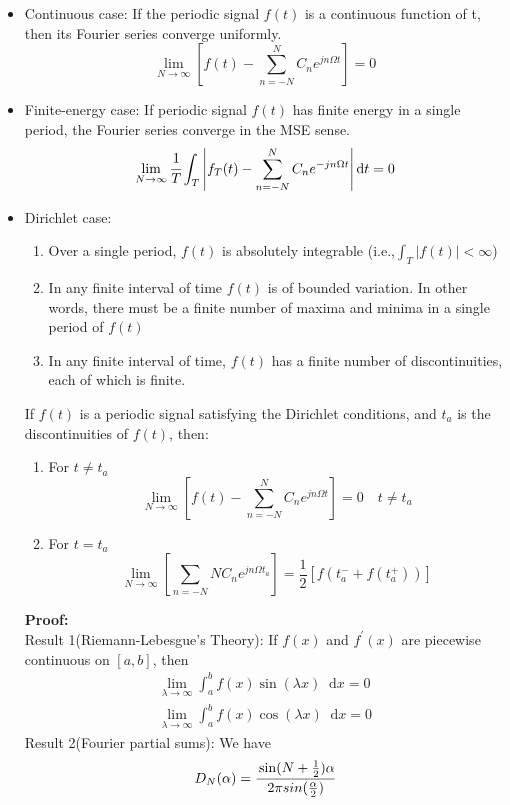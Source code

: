 \documentclass[margin,line]{res}
\newcommand*{\dif}{\mathop{}\!\mathrm{d}}
\begin{document}
\begin{resume}
\begin{itemize}
\item Continuous case: If the periodic signal $f(t)$ is a continuous function of t, then its Fourier series converge uniformly.
$$
\lim_{N \rightarrow \infty} \left[ f(t) - \sum\limits_{n=-N}^{N}{C_n e^{jn\Omega t}} \right] = 0
$$
\item Finite-energy case: If periodic signal $f(t)$ has finite energy in a single period, the Fourier series converge in the MSE sense.
$$
\lim_{N \rightarrow \infty} \cfrac{1}{T} \int_{T}\left| f_T(t) - \sum\limits_{n=-N}^{N}C_n e^{-jn\Omega t} \right| \dif t  = 0\nonumber
$$
\item Dirichlet case:
\begin{enumerate}
	\item Over a single period, $f(t)$ is absolutely integrable (i.e.,$\int_{T}\left| f(t) \right| < \infty$)
	\item In any finite interval of time $f(t)$ is of bounded variation. In other words, there must be a finite number of maxima and minima in a single period of $f(t)$
	\item In any finite interval of time, $f(t)$ has a finite number of discontinuities, each of which is finite.
\end{enumerate}
If $f(t)$ is a periodic signal satisfying the Dirichlet conditions, and $t_a$ is the discontinuities of $f(t)$, then:
\begin{enumerate}
	\item For $t \neq t_a$
	$$
	\lim_{N \rightarrow \infty} \left[ f(t) - \sum\limits_{n=-N}^{N} C_n e^{jn\Omega t} \right] = 0 \quad t \neq t_a
	$$
	\item For $t = t_a$
	$$
	\lim_{N \rightarrow \infty} \left[ \sum\limits_{n=-N}{N} C_n e^{jn\Omega t_a}\right] =
	\frac{1}{2}\left[ f(t_a^{-} + f(t_a^{+})) \right]
	$$
\end{enumerate}
\textbf{Proof:} \\
Result 1(Riemann-Lebesgue's Theory): If $f(x)$ and $f^{'}(x)$ are piecewise continuous on $\left[ a,b \right]$, then
\begin{align}
\lim_{\lambda \rightarrow \infty} \int_{a}^{b} f(x)\sin(\lambda x) \dif x = 0 \nonumber \\
\lim_{\lambda \rightarrow \infty} \int_{a}^{b} f(x)\cos(\lambda x) \dif x = 0 \nonumber
\end{align}
Result 2(Fourier partial sums): We have 
\begin{align}
	D_N(\alpha) &= \cfrac{\sin(N+\frac{1}{2})\alpha}{2\pi sin(\frac{\alpha}{2})} \nonumber \\

\end{align}
\end{itemize}
\end{resume}
\end{document}
